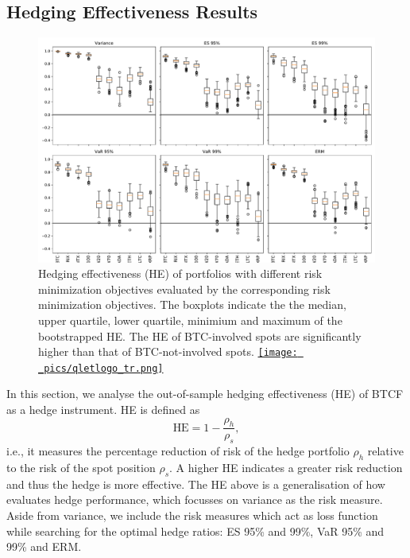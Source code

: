 \subsection{Hedging Effectiveness Results}\label{sec: HE results}
\begin{figure}[t]
\includegraphics[width=\textwidth]{_pics/HE_boxplot.pdf}
  \caption{Hedging effectiveness (HE) of portfolios with different risk minimization objectives evaluated by the corresponding risk minimization objectives.
            The boxplots indicate the the median, upper quartile, lower quartile, minimium and maximum of the bootstrapped HE.
            The HE of BTC-involved spots are significantly higher than that of BTC-not-involved spots.
  \href{http://www.quantlet.com/}{\texttt{[image: \_pics/qletlogo\_tr.png]}} }
\label{fig:HEboxplot}
\end{figure}
In this section, we analyse the out-of-sample hedging effectiveness
(HE) of BTCF as a hedge instrument. 
HE is defined as $$\text{HE} = 1-\frac{\rho_h}{\rho_s},$$
i.e., it measures the percentage reduction of risk of the hedge
portfolio $\rho_h $ relative to the risk of the spot position $\rho_s$.
A higher HE indicates a greater risk reduction and thus the hedge is
more effective.  
The HE above is a generalisation of how \citet{ederington1979hedging}
evaluates hedge performance, which focusses on variance as the risk
measure. 
Aside from variance, we include the risk measures which act as
loss function while searching for the optimal hedge ratios: ES 95\%
and 99\%, VaR 95\% and 99\% and ERM.


